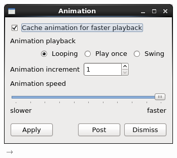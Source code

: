 \begin{frame}
\begin{columns}
\begin{column}{4cm}
	\includegraphics[width=\columnwidth]{figs/visit-guis/visit_animation}
	\\
	\textcolor{DarkBlue}{}
         $\rightarrow$ 
\end{column}
\end{columns}
\end{frame}



